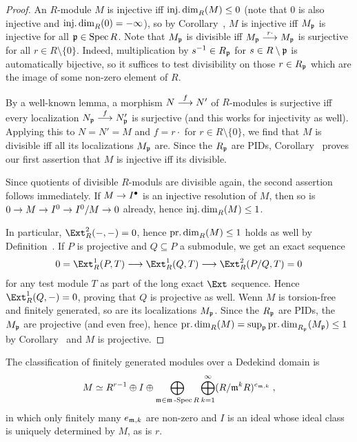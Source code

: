\documentclass[a4paper,parskip=half,numbers=enddot, DIV=12]{scrreprt}
\begin{document}
\begin{proof}
	An $R$-module $M$ is injective iff $\operatorname{inj.dim}_R(M)\leq 0$ (note that $0$ is also injective and $\operatorname{inj.dim}_R(0)=-\infty$), so by Corollary~, $M$ is injective iff $M_{\mathfrak{p}}$ is injective for all $\mathfrak{p}\in \operatorname{Spec} R$. Note that $M_{\mathfrak{p}}$ is divisible iff $M_\pp\morphism[r\cdot]M_\pp$ is surjective for all $r\in R\setminus\{0\}$. Indeed, multiplication by $s^{-1}\in R_{\mathfrak{p}}$ for $s\in R\setminus \mathfrak{p}$ is automatically bijective, so it suffices to test divisibility on those $r\in R_{\mathfrak{p}}$ which are the image of some non-zero element of $R$.
	
	By a well-known lemma, a morphism $N\morphism[f]N'$ of $R$-modules is surjective iff every localization $N_\pp\morphism[f]N'_\pp$ is surjective (and this works for injectivity as well). Applying this to $N=N'=M$ and $f=r\cdot$ for $r\in R\setminus\{0\}$, we find that $M$ is divisible iff all its localizations $M_{\mathfrak{p}}$ are. Since the $R_{\mathfrak{p}}$ are PIDs, Corollary~ proves our first assertion that $M$ is injective iff its divisible.
	
	Since quotients of divisible $R$-moduls are divisible again, the second assertion follows immediately. If $M\morphism I^\bullet$ is an injective resolution of $M$, then so is $0\morphism M\morphism I^0\morphism I^0/M\morphism 0$ already, hence $\operatorname{inj.dim}_R(M)\leq 1$.
	
	In particular, $\Ext_R^2(-,-)=0$, hence $\operatorname{pr.dim}_R(M)\leq 1$ holds as well by Definition~. If $P$ is projective and $Q\subseteq P$ a submodule, we get an exact sequence 
	\begin{align*}
		0=\Ext_R^1(P,T)\morphism\Ext_R^1(Q,T)\morphism\Ext_R^2(P/Q,T)=0
	\end{align*}
	for any test module $T$ as part of the long exact $\Ext$ sequence. Hence $\Ext_R^1(Q,-)=0$, proving that $Q$ is projective as well. Wenn $M$ is torsion-free and finitely generated, so are its localizations $M_{\mathfrak{p}}$. Since the $R_{\mathfrak{p}}$ are PIDs, the $M_{\mathfrak{p}}$ are projective (and even free), hence $\operatorname{pr.dim}_R(M)=\sup_{\mathfrak{p}}\operatorname{pr.dim}_{R_{\mathfrak{p}}}(M_{\mathfrak{p}})\leq 1$ by Corollary~ and $M$ is projective.
\end{proof}
\begin{rem*}
	The classification of finitely generated modules over a Dedekind domain is
	\begin{align*}
		M\simeq R^{r-1}\oplus I\oplus \bigoplus_{\mathfrak{m}\in\mathfrak{m}\operatorname{-Spec} R}\bigoplus_{k=1}^\infty (R/\mathfrak{m}^kR)^{e_{\mathfrak{m},k}}\;,
	\end{align*}
	in which only finitely many $e_{\mathfrak{m},k}$ are non-zero and $I$ is an ideal whose ideal class is uniquely determined by $M$, as is $r$.
\end{rem*}
	
\end{document}
